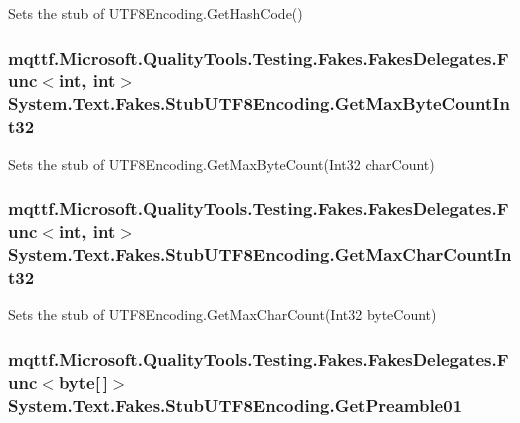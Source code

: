 Sets the stub of U\-T\-F8\-Encoding.\-Get\-Hash\-Code()

\hypertarget{class_system_1_1_text_1_1_fakes_1_1_stub_u_t_f8_encoding_a19acf68a9293cb30ab5d9f86b8dcb817}{
\subsubsection[{Get\-Max\-Byte\-Count\-Int32}]{\setlength{\rightskip}{0pt plus 5cm}mqttf.\-Microsoft.\-Quality\-Tools.\-Testing.\-Fakes.\-Fakes\-Delegates.\-Func$<$int, int$>$ System.\-Text.\-Fakes.\-Stub\-U\-T\-F8\-Encoding.\-Get\-Max\-Byte\-Count\-Int32}}\label{class_system_1_1_text_1_1_fakes_1_1_stub_u_t_f8_encoding_a19acf68a9293cb30ab5d9f86b8dcb817}


Sets the stub of U\-T\-F8\-Encoding.\-Get\-Max\-Byte\-Count(\-Int32 char\-Count)

\hypertarget{class_system_1_1_text_1_1_fakes_1_1_stub_u_t_f8_encoding_a3cc0978c605daf5beda7aa6cede3013c}{
\subsubsection[{Get\-Max\-Char\-Count\-Int32}]{\setlength{\rightskip}{0pt plus 5cm}mqttf.\-Microsoft.\-Quality\-Tools.\-Testing.\-Fakes.\-Fakes\-Delegates.\-Func$<$int, int$>$ System.\-Text.\-Fakes.\-Stub\-U\-T\-F8\-Encoding.\-Get\-Max\-Char\-Count\-Int32}}\label{class_system_1_1_text_1_1_fakes_1_1_stub_u_t_f8_encoding_a3cc0978c605daf5beda7aa6cede3013c}


Sets the stub of U\-T\-F8\-Encoding.\-Get\-Max\-Char\-Count(\-Int32 byte\-Count)

\hypertarget{class_system_1_1_text_1_1_fakes_1_1_stub_u_t_f8_encoding_a153a9d57c5d334635231426664b6b948}{
\subsubsection[{Get\-Preamble01}]{\setlength{\rightskip}{0pt plus 5cm}mqttf.\-Microsoft.\-Quality\-Tools.\-Testing.\-Fakes.\-Fakes\-Delegates.\-Func$<$byte\mbox{[}$\,$\mbox{]}$>$ System.\-Text.\-Fakes.\-Stub\-U\-T\-F8\-Encoding.\-Get\-Preamble01}}\label{class_system_1_1_text_1_1_fakes_1_1_stub_u_t_f8_encoding_a153a9d57c5d334635231426664b6b948}


